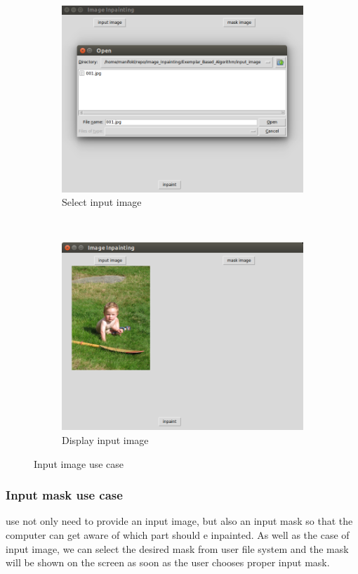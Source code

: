 \begin{figure}[H]
\centering
\begin{subfigure}{0.45\textwidth}
\includegraphics[width=\textwidth]{ex_input.png}
\caption{Select input image}
\end{subfigure}
~
\begin{subfigure}{0.45\textwidth}
\includegraphics[width=\textwidth]{ex_input_img.png}
\caption{Display input image}
\end{subfigure}
\caption{Input image use case}
\end{figure}

\subsubsection{Input mask use case}
use not only need to provide an input image, but also an input mask so that the computer can get aware of which part should e inpainted. As well as the case of input image, we can select the desired mask from user file system and the mask will be shown on the screen as soon as the user chooses proper input mask.

